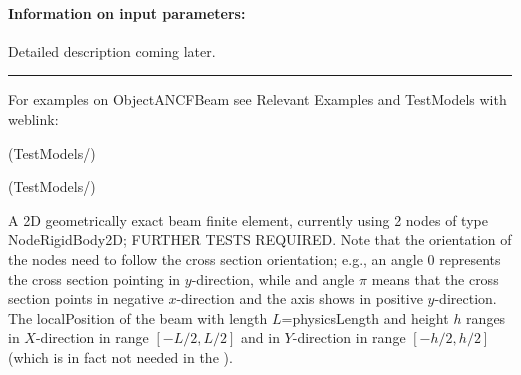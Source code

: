 \paragraph{Information on input parameters:} 
\finishTable
 \noindent
    Detailed description coming later.
\vspace{6pt}\par\noindent\rule{\textwidth}{0.4pt}
%
\noindent For examples on ObjectANCFBeam see Relevant Examples and TestModels with weblink:
\bi
\item {} (TestModels/)
\item {} (TestModels/)

\ei

%
\newpage


\label{sec:item:ObjectBeamGeometricallyExact2D}
A 2D geometrically exact beam finite element, currently using 2 nodes of type NodeRigidBody2D; FURTHER TESTS REQUIRED. Note that the orientation of the nodes need to follow the cross section orientation; e.g., an angle 0 represents the cross section pointing in $y$-direction, while and angle $\pi$ means that the cross section points in negative $x$-direction and the axis shows in positive $y$-direction. The localPosition of the beam with length $L$=physicsLength and height $h$ ranges in $X$-direction in range $[-L/2, L/2]$ and in $Y$-direction in range $[-h/2,h/2]$ (which is in fact not needed in the ).
\vspace{12pt}\\


